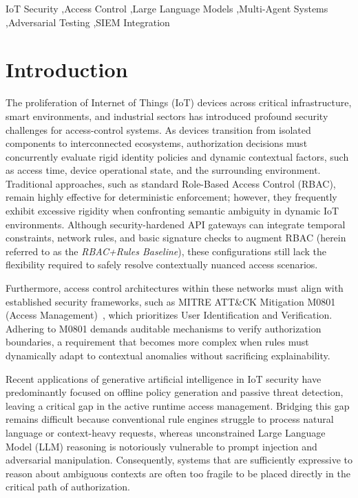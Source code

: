 \documentclass[
]{ceurart}
\begin{document}
\begin{keywords}
    IoT Security \sep Access Control \sep Large Language Models \sep Multi-Agent Systems \sep Adversarial Testing \sep SIEM Integration
\end{keywords}

\maketitle

\section{Introduction}

The proliferation of Internet of Things (IoT) devices across critical infrastructure, smart environments, and industrial sectors has introduced profound security challenges for access-control systems. As devices transition from isolated components to interconnected ecosystems, authorization decisions must concurrently evaluate rigid identity policies and dynamic contextual factors, such as access time, device operational state, and the surrounding environment. Traditional approaches, such as standard Role-Based Access Control (RBAC), remain highly effective for deterministic enforcement; however, they frequently exhibit excessive rigidity when confronting semantic ambiguity in dynamic IoT environments. Although security-hardened API gateways can integrate temporal constraints, network rules, and basic signature checks to augment RBAC (herein referred to as the \textit{RBAC+Rules Baseline}), these configurations still lack the flexibility required to safely resolve contextually nuanced access scenarios. 

Furthermore, access control architectures within these networks must align with established security frameworks, such as MITRE ATT\&CK Mitigation M0801 (Access Management)~\cite{mitre2023attack}, which prioritizes User Identification and Verification. Adhering to M0801 demands auditable mechanisms to verify authorization boundaries, a requirement that becomes more complex when rules must dynamically adapt to contextual anomalies without sacrificing explainability.

Recent applications of generative artificial intelligence in IoT security have predominantly focused on offline policy generation and passive threat detection, leaving a critical gap in the active runtime access management. Bridging this gap remains difficult because conventional rule engines struggle to process natural language or context-heavy requests, whereas unconstrained Large Language Model (LLM) reasoning is notoriously vulnerable to prompt injection and adversarial manipulation. Consequently, systems that are sufficiently expressive to reason about ambiguous contexts are often too fragile to be placed directly in the critical path of authorization.
\end{document}

